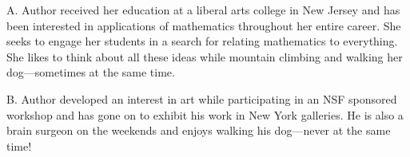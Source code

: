 \documentclass{primus}
\begin{document}
A. Author received her education at a liberal arts college in New Jersey and has been interested in applications of mathematics throughout her entire career. She seeks to engage her students in a search for relating mathematics to everything. She likes to think about all these ideas  while mountain climbing and walking her dog---sometimes at the same time.

\vspace*{.3 true cm} \noindent B. Author developed an interest in art while participating in an NSF sponsored workshop and has gone on to exhibit his work in New York galleries. He is also a brain surgeon on the weekends and enjoys  walking his dog---never at the same time!
\end{document}
